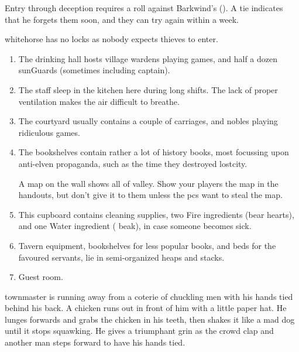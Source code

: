 \begin{multicols}{2}
Entry through deception requires a roll against Barkwind's  (\tn).
A tie indicates that he forgets them soon, and they can try again within a week.

\Gls{whitehorse} has no locks as nobody expects thieves to enter.
 
\begin{enumerate}
  \item
  The drinking hall hosts \gls{village} \glspl{warden} playing games, and half a dozen \glspl{sunGuard} (sometimes including \gls{captain}).
  \label{horseHall}
  \item
  \label{horseKitch}
  The staff sleep in the kitchen here during long shifts.
  The lack of proper ventilation makes the air difficult to breathe.
  \item
  \label{horseYard}
  The courtyard usually contains a couple of carriages, and nobles playing ridiculous games.
  \item
  \label{horseUpstairs}
  The bookshelves contain rather a lot of history books, most focussing upon anti-elven propaganda, such as the time they destroyed \gls{lostcity}.

  A map on the wall shows all of \gls{valley}.
  Show your players the map in the handouts, but don't give it to them unless the \glspl{pc} want to steal the map.
  \item
  \label{horseCupboard}
  This cupboard contains cleaning supplies, two Fire \glspl{ingredient} (bear hearts), and one Water \gls{ingredient} ( beak), in case someone becomes sick.
  \item
  \label{horseSideRoom}
  Tavern equipment, bookshelves for less popular books, and beds for the favoured servants, lie in semi-organized heaps and stacks.
  \item
  \label{wolfRoom}
  Guest room.
\end{enumerate}

\begin{boxtext}
  \Gls{townmaster} is running away from a coterie of chuckling men with his hands tied behind his back.
   A chicken runs out in front of him with a little paper hat.
   He lunges forwards and grabs the chicken in his teeth, then shakes it like a mad dog until it stops squawking.
   He gives a triumphant grin as the crowd clap and another man steps forward to have his hands tied.
\end{boxtext}


\end{multicols}
